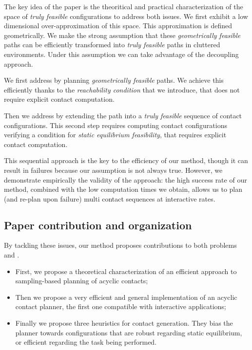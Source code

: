 
The key idea of the paper is the theoritical and practical characterization of the space of \textit{truly feasible} configurations to address both issues.
We first exhibit a low dimensional over-approximation of this space. This approximation is defined geometrically. 
We make the strong assumption that these \textit{geometrically feasible} paths can be efficiently transformed into \textit{truly feasible} paths
in cluttered environments. 
Under this assumption we can take advantage of the decoupling approach.

We first address \Pa by planning \textit{geometrically feasible} paths. We achieve this efficiently thanks to the \textit{reachability condition} that we introduce, that 
does not require explicit contact computation.

Then we address \Pb by extending the path into a \textit{truly feasible} sequence of contact configurations.
This second step requires computing contact configurations verifying a condition for \textit{static equilibrium feasibility}, that requires
explicit contact computation.

This sequential approach is the key to the efficiency of our method, though it
can result in failures because our assumption is not always true. However, we demonstrate empirically the validity of the approach: the high success rate of our method, combined with the low computation times we obtain, allows us to plan (and re-plan upon failure) multi contact sequences at interactive rates.

\subsection{Paper contribution and organization}


By tackling these issues, our method proposes contributions to both problems \Pa and \Pb.
\begin{itemize}
\item First, we propose a theoretical characterization of an efficient approach to sampling-based planning of acyclic contacts;
\item Then we propose a very efficient and general implementation of an acyclic contact planner, the first one compatible with interactive applications;
\item Finally we propose three heuristics for contact generation. They bias the planner towards configurations that are robust regarding static equilibrium, or 
efficient regarding the task being performed.
\end{itemize}

